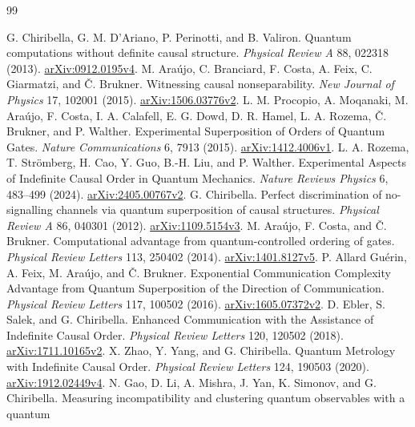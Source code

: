 \documentclass[11pt,letterpaper]{article}
\theoremstyle{definition}\newtheorem{definition}[theorem]{Definition}
\begin{document}
\begin{thebibliography}{99}
\small\raggedright\setlength{\itemsep}{2pt}
 G. Chiribella, G. M. D'Ariano, P. Perinotti, and B. Valiron.
Quantum computations without definite causal structure.
\emph{Physical Review A} 88, 022318 (2013).
\href{https://arxiv.org/abs/0912.0195v4}{arXiv:0912.0195v4}.
 M. Ara\'ujo, C. Branciard, F. Costa, A. Feix, C. Giarmatzi,
and \v C. Brukner. Witnessing causal nonseparability.
\emph{New Journal of Physics} 17, 102001 (2015).
\href{https://arxiv.org/abs/1506.03776v2}{arXiv:1506.03776v2}.
 L. M. Procopio, A. Moqanaki, M. Ara\'ujo, F. Costa, I. A. Calafell, E. G. Dowd, D. R. Hamel, L. A. Rozema, \v C. Brukner, and P. Walther.
Experimental Superposition of Orders of Quantum Gates. \emph{Nature Communications} 6, 7913 (2015).
\href{https://arxiv.org/abs/1412.4006v1}{arXiv:1412.4006v1}.
 L. A. Rozema, T. Str\"omberg, H. Cao, Y. Guo, B.-H. Liu, and P. Walther.
Experimental Aspects of Indefinite Causal Order in Quantum Mechanics. \emph{Nature Reviews Physics} 6, 483--499 (2024).
\href{https://arxiv.org/abs/2405.00767v2}{arXiv:2405.00767v2}.
 G. Chiribella.
Perfect discrimination of no-signalling channels via quantum superposition of causal structures. \emph{Physical Review A} 86, 040301 (2012).
\href{https://arxiv.org/abs/1109.5154v3}{arXiv:1109.5154v3}.
 M. Ara\'ujo, F. Costa, and \v C. Brukner.
Computational advantage from quantum-controlled ordering of gates.
\emph{Physical Review Letters} 113, 250402 (2014).
\href{https://arxiv.org/abs/1401.8127v5}{arXiv:1401.8127v5}.
 P. Allard Gu\'erin, A. Feix, M. Ara\'ujo, and \v C. Brukner.
Exponential Communication Complexity Advantage from Quantum Superposition of
the Direction of Communication. \emph{Physical Review Letters} 117, 100502 (2016).
\href{https://arxiv.org/abs/1605.07372v2}{arXiv:1605.07372v2}.
 D. Ebler, S. Salek, and G. Chiribella.
Enhanced Communication with the Assistance of Indefinite Causal Order.
\emph{Physical Review Letters} 120, 120502 (2018).
\href{https://arxiv.org/abs/1711.10165v2}{arXiv:1711.10165v2}.
 X. Zhao, Y. Yang, and G. Chiribella.
Quantum Metrology with Indefinite Causal Order. \emph{Physical Review Letters} 124, 190503 (2020).
\href{https://arxiv.org/abs/1912.02449v4}{arXiv:1912.02449v4}.
 N. Gao, D. Li, A. Mishra, J. Yan, K. Simonov, and G. Chiribella.
Measuring incompatibility and clustering quantum observables with a quantum

\end{thebibliography}
\end{document}
